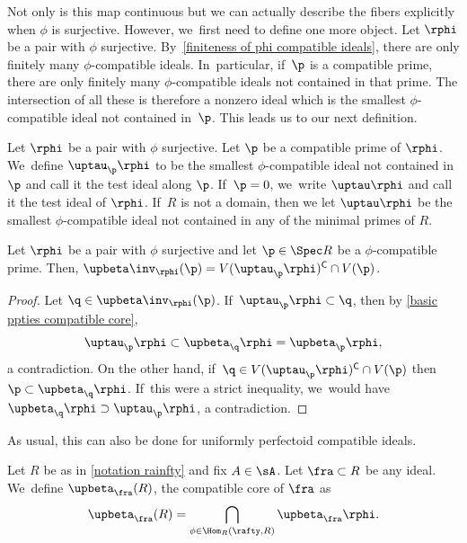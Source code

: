 Not only is this map continuous but we can actually describe the fibers explicitly when $\phi$ is surjective. However, we~first need to define one more object.
Let $\rphi$ be a pair with $\phi$ surjective. By~\autoref{finiteness of phi compatible ideals}, there are only finitely many $\phi$-compatible ideals. In~particular, if~$\p$ is a compatible prime, there are only finitely many $\phi$-compatible ideals not contained in that prime. The intersection of all these is therefore a nonzero ideal which is the smallest $\phi$-compatible ideal not contained in~$\p$. This leads us to our next definition.

\begin{definition}
Let $\rphi$ be a pair with $\phi$ surjective. Let $\p$ be a compatible prime of $\rphi$. We~define $\uptau_\p\rphi$ to be the smallest $\phi$-compatible ideal not contained in $\p$ and call it the test ideal along $\p$. If~$\p=0$, we~write $\uptau\rphi$ and call it the test ideal of $\rphi$. If~$R$ is not a domain, then we let $\uptau\rphi$ be the smallest $\phi$-compatible ideal not contained in any of the minimal primes of $R$.
\end{definition}

\begin{proposition}\label{beta is locally closed}
Let $\rphi$ be a pair with $\phi$ surjective and let $\p\in \Spec R$ be a $\phi$-compatible prime. Then, $\upbeta\inv_{\rphi}(\p)=V(\uptau_\p\rphi)^\mathsf{C}\cap V(\p)$.
\end{proposition}

\begin{proof}
Let $\q\in \upbeta\inv_{\rphi}(\p)$. If~$\uptau_\p\rphi\subset \q$, then by \autoref{basic ppties compatible core},
\[\uptau_\p\rphi\subset \upbeta_\q\rphi=\upbeta_\p\rphi,\]
a contradiction. On the other hand, if~$\q\in V(\uptau_\p\rphi)^\mathsf{C} \cap V(\p)$ then $\p\subset \upbeta_\q\rphi$. If~this were a strict inequality, we~would have $\upbeta_\q\rphi\supset \uptau_\p\rphi$, a contradiction.
\end{proof}

As usual, this can also be done for uniformly perfectoid compatible ideals.

\begin{definition}
Let $R$ be as in \autoref{notation rainfty} and fix $A\in \sA$. Let $\fra\subset R$ be any ideal. We~define $\upbeta_\fra(R)$, the compatible core of $\fra$ as
\[
\upbeta_\fra(R)=\bigcap_{\phi\in \Hom_R\left(\rafty,R\right)}
\upbeta_\fra\rphi.
\]
\end{definition}

